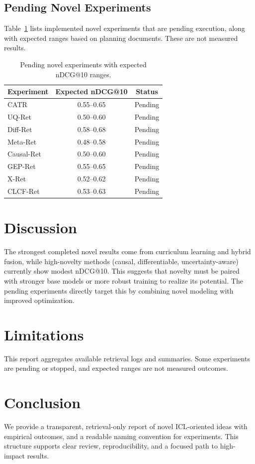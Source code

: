 \documentclass[conference]{IEEEtran}
\begin{document}
\subsection{Pending Novel Experiments}
Table~\ref{tab:pending} lists implemented novel experiments that are pending execution, along with expected ranges based on planning documents. These are not measured results.
\begin{table}[!t]
\centering
\small
\begin{tabular}{lcc}
\toprule
\textbf{Experiment} & \textbf{Expected nDCG@10} & \textbf{Status} \\
\midrule
CATR & 0.55--0.65 & Pending \\
UQ-Ret & 0.50--0.60 & Pending \\
Diff-Ret & 0.58--0.68 & Pending \\
Meta-Ret & 0.48--0.58 & Pending \\
Causal-Ret & 0.50--0.60 & Pending \\
GEP-Ret & 0.55--0.65 & Pending \\
X-Ret & 0.52--0.62 & Pending \\
CLCF-Ret & 0.53--0.63 & Pending \\
\bottomrule
\end{tabular}
\caption{Pending novel experiments with expected nDCG@10 ranges.}
\label{tab:pending}
\end{table}

\section{Discussion}
The strongest completed novel results come from curriculum learning and hybrid fusion, while high-novelty methods (causal, differentiable, uncertainty-aware) currently show modest nDCG@10. This suggests that novelty must be paired with stronger base models or more robust training to realize its potential. The pending experiments directly target this by combining novel modeling with improved optimization.

\section{Limitations}
This report aggregates available retrieval logs and summaries. Some experiments are pending or stopped, and expected ranges are not measured outcomes.

\section{Conclusion}
We provide a transparent, retrieval-only report of novel ICL-oriented ideas with empirical outcomes, and a readable naming convention for experiments. This structure supports clear review, reproducibility, and a focused path to high-impact results.
\end{document}

